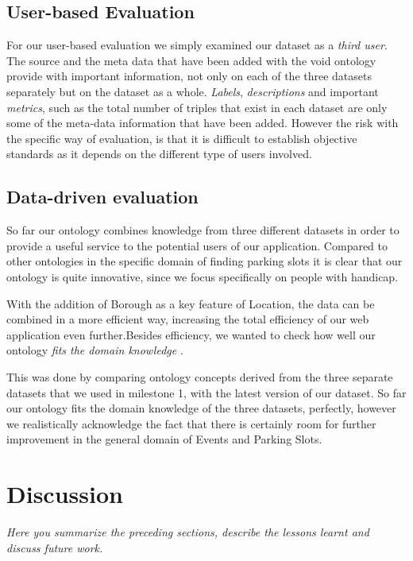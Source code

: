 \documentclass[runningheads,a4paper]{../../StyleFiles/llncs}
\begin{document}
\subsection{User-based Evaluation}
For our user-based evaluation we simply examined our dataset as a \textit{third
user}. The source and the meta data that have been added with the void ontology
provide with important information, not only on each of the three datasets
separately but on the dataset as a whole. \textit{Labels}, \textit{descriptions}
and important \textit{metrics}, such as the total number of triples that exist
in each dataset are only some of the meta-data information that have been added.
However the risk with the specific way of evaluation, is that it is difficult to
establish objective standards as it depends on the different type of users
involved.

\subsection{Data-driven evaluation}
So far our ontology combines knowledge from three different datasets in order to
provide a useful service to the potential users of our application. Compared to
other ontologies in the specific domain of finding parking slots it is clear
that our ontology is quite innovative, since we focus specifically on people
with handicap. 

With the addition of Borough as a key feature of Location, the data can be
combined in a more efficient way, increasing the total efficiency of our web
application even further.Besides efficiency, we wanted to check how well our
ontology \textit{fits the domain knowledge} \cite{brewster2004data}. 

This was done by comparing ontology concepts derived from the three separate
datasets that we used in milestone 1, with the latest version of our dataset.
So far our ontology fits the domain knowledge of the three datasets, perfectly,
however we realistically acknowledge the fact that there is certainly room for
further improvement in the general domain of Events and Parking Slots.


\section{Discussion}
\textit{Here you summarize the preceding sections, describe the lessons learnt and discuss future work.}





\end{document}
